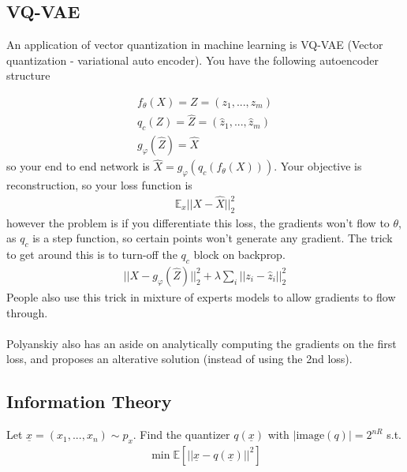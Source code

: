 \subsection{VQ-VAE}
An application of vector quantization in machine learning is VQ-VAE (Vector quantization - variational auto encoder). You have the following autoencoder structure

\begin{align}
	f_\theta(X) = Z = (z_1,..., z_m)\\
q_c (Z)  = \hat Z = (\hat z_1, ..., \hat z_m)\\
g_\varphi(\hat Z) = \hat X
\end{align}
so your end to end network is $\hat X = g_\varphi(q_c(f_\theta(X)))$. Your objective is reconstruction, so your loss function is
\begin{align}
	\mathbb E_x||X -\hat X||^2_2
\end{align}
however the problem is if you differentiate this loss, the gradients won't flow to $\theta$, as $q_c$ is a step function, so certain points won't generate any gradient. The trick to get around this is to turn-off the $q_c$ block on backprop.
\begin{align}
	||X - g_\varphi(\hat Z) ||^2_2 + \lambda \sum_i || z_i - \hat z_i ||_2^2
\end{align}
People also use this trick in mixture of experts models to allow gradients to flow through.\\
\\
Polyanskiy also has an aside on analytically computing the gradients on the first loss, and proposes an alterative solution (instead of using the 2nd loss).

\subsection{Information Theory}
Let $\underline x = (x_1 , ..., x_n) \sim p_x$. Find the quantizer $q(\underline x)$ with $| \text{image} (q)| = 2^{nR}$ s.t.
\begin{align}
	\min \mathbb E[||\underline x - q(\underline x)||^2]
\end{align}

